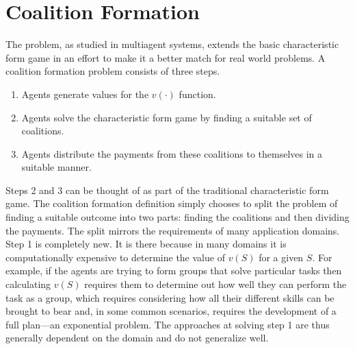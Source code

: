 






\section{Coalition Formation}
\label{sec:coalition-formation}

The  problem, as studied in multiagent
systems, extends the basic characteristic form game in an effort to
make it a better match for real world problems. A coalition formation
problem consists of three steps.
\begin{enumerate}
\item Agents generate values for the $v(\cdot)$ function.
\item Agents solve the characteristic form game by finding a suitable
  set of coalitions.
\item Agents distribute the payments from these coalitions to
  themselves in a suitable manner.
\end{enumerate}

Steps 2 and 3 can be thought of as part of the traditional
characteristic form game. The coalition formation definition simply
chooses to split the problem of finding a suitable outcome \vu{} into
two parts: finding the coalitions and then dividing the payments. The
split mirrors the requirements of many application domains. Step 1 is
completely new. It is there because in many domains it is
computationally expensive to determine the value of $v(S)$ for a given
$S$. For example, if the agents are trying to form groups that solve
particular tasks then calculating $v(S)$ requires them to determine
out how well they can perform the task as a group, which requires
considering how all their different skills can be brought to bear and,
in some common scenarios, requires the development of a full plan---an
exponential problem. The approaches at solving step 1 are thus
generally dependent on the domain and do not generalize well.




